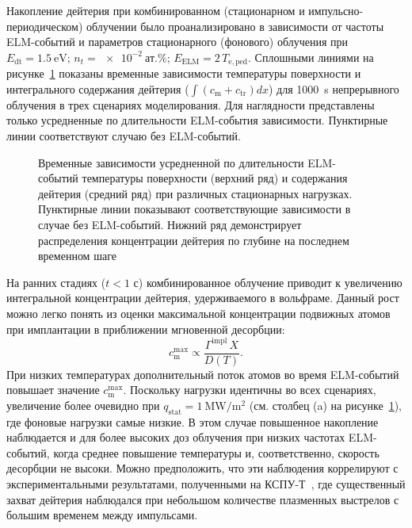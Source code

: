 Накопление дейтерия при комбинированном (стационарном и импульсно-периодическом) облучении было проанализировано в зависимости от частоты ELM-событий и параметров стационарного (фонового) облучения при $E_{\mathrm{dt}}=\SI{1.5}{\electronvolt}$; $n_{t}=\SI{e-2}{\text{ат.}\percent}$; $E_{\mathrm{ELM}}=2\, T_{\mathrm{e,ped}}$. Сплошными линиями на рисунке~\cref{fig:ch3/ELMs_frequency} показаны временные зависимости температуры поверхности и интегрального содержания дейтерия ($\int \left(c_{\mathrm{m}}+c_{\mathrm{tr}}\right)dx$) для \SI{1000}{\second} непрерывного облучения в трех сценариях моделирования. Для наглядности представлены только усредненные по длительности ELM-события зависимости. Пунктирные линии соответствуют случаю без ELM-событий.
\begin{figure}[ht]
	\caption{Временные зависимости усредненной по длительности ELM-событий температуры поверхности (верхний ряд) и содержания дейтерия (средний ряд) при различных стационарных нагрузках. Пунктирные линии показывают соответствующие зависимости в случае без ELM-событий. Нижний ряд демонстрирует распределения концентрации дейтерия по глубине на последнем временном шаге}\label{fig:ch3/ELMs_frequency}
\end{figure}
На ранних стадиях ($t<1$ с) комбинированное облучение приводит к увеличению интегральной концентрации дейтерия, удерживаемого в вольфраме. Данный рост можно легко понять из оценки максимальной концентрации подвижных атомов при имплантации в приближении мгновенной десорбции:
\begin{equation}
	\label{eq:ch3/max_c}
	c_{\mathrm{m}}^{\max}\propto \frac{\Gamma^{\mathrm{impl}} \, X}{D(T)}.
\end{equation}
При низких температурах дополнительный поток атомов во время ELM-событий повышает значение $c_{\mathrm{m}}^{\max}$. Поскольку нагрузки идентичны во всех сценариях, увеличение более очевидно при $q_{\mathrm{stat}}=\SI{1}{\mega\watt\per\meter\squared}$ (см. столбец (a) на рисунке~\cref{fig:ch3/ELMs_frequency}), где фоновые нагрузки самые низкие. В этом случае повышенное накопление наблюдается и для более высоких доз облучения при низких частотах ELM-событий, когда среднее повышение температуры и, соответственно, скорость десорбции не высоки. Можно предположить, что эти наблюдения коррелируют с экспериментальными результатами, полученными на КСПУ-Т~\cite{Ogorodnikova,Poskakalov2020}, где существенный захват дейтерия наблюдался при небольшом количестве плазменных выстрелов с большим временем между импульсами.

